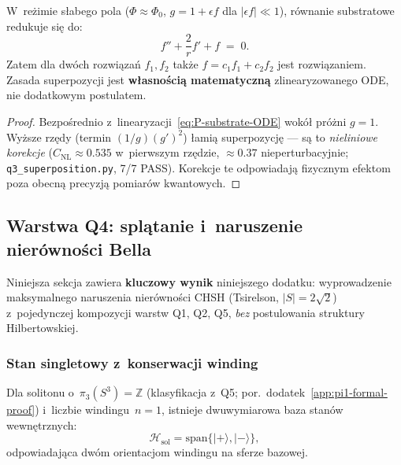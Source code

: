\begin{theorem}%
\label{thm:P-superposition}
W~reżimie słabego pola ($\Phi \approx \Phi_0$, $g = 1 + \epsilon f$
dla $|\epsilon f| \ll 1$), równanie substratowe redukuje się do:
\begin{equation}\label{eq:P-linearized}
  f'' + \frac{2}{r}f' + f \;=\; 0.
\end{equation}
Zatem dla dwóch rozwiązań $f_1, f_2$ także
$f = c_1 f_1 + c_2 f_2$ jest rozwiązaniem. Zasada superpozycji
jest \textbf{własnością matematyczną} zlinearyzowanego ODE,
nie dodatkowym postulatem.
\end{theorem}

\begin{proof}
Bezpośrednio z~linearyzacji~\eqref{eq:P-substrate-ODE}
wokół próżni $g=1$. Wyższe rzędy (termin $(1/g)(g')^2$) łamią
superpozycję --- są to \emph{nieliniowe korekcje}
($C_{\mathrm{NL}} \approx 0.535$ w~pierwszym rzędzie,
$\approx 0.37$ nieperturbacyjnie; \texttt{q3\_superposition.py}, 7/7 PASS).
Korekcje te odpowiadają fizycznym efektom poza obecną precyzją
pomiarów kwantowych.
\end{proof}

\subsection{Warstwa Q4: splątanie i~naruszenie nierówności Bella}%
\label{app:P-Q4}

Niniejsza sekcja zawiera \textbf{kluczowy wynik} niniejszego
dodatku: wyprowadzenie maksymalnego naruszenia nierówności
CHSH (Tsirelson, $|S| = 2\sqrt{2}$) z~pojedynczej kompozycji
warstw Q1, Q2, Q5, \emph{bez} postulowania struktury Hilbertowskiej.

\subsubsection{Stan singletowy z~konserwacji winding}%
\label{sssec:P-singlet}

\begin{definition}\label{def:P-top-basis}
Dla solitonu o~$\pi_3(S^3) = \mathbb{Z}$ (klasyfikacja z~Q5;
por.\ dodatek~\ref{app:pi1-formal-proof})
i~liczbie windingu~$n = 1$, istnieje dwuwymiarowa baza
stanów wewnętrznych:
\begin{equation}\label{eq:P-top-basis}
  \mathcal{H}_{\mathrm{sol}} = \mathrm{span}\{|+\rangle, |-\rangle\},
\end{equation}
odpowiadająca dwóm orientacjom windingu na sferze bazowej.
\end{definition}

